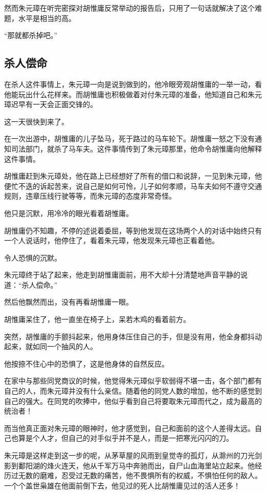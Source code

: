\begin{multicols}{\theparacolNo}
		然而朱元璋在听完密探对胡惟庸反常举动的报告后，只用了一句话就解决了这个难题，水平是相当的高。

		“那就都杀掉吧。”

		\subsection{杀人偿命}
		在杀人这件事情上，朱元璋一向是说到做到的，他冷眼旁观胡惟庸的一举一动，看他能玩出什么花样来。而胡惟庸也积极做着对付朱元璋的准备，他知道自己和朱元璋迟早有一天会正面交锋的。

		这一天很快到来了。

		在一次出游中，胡惟庸的儿子坠马，死于路过的马车轮下。胡惟庸一怒之下没有通知司法部门，就杀了马车夫。这件事情传到了朱元璋那里，他命令胡惟庸向他解释这件事情。

		胡惟庸赶到朱元璋处，他在路上已经想好了所有的借口和说辞，一见到朱元璋，他便忙不迭的诉起苦来，说自己是如何可怜，儿子如何孝顺，马车夫如何不遵守交通规则，违章压线行驶等等，而朱元璋的态度非常奇怪。

		他只是沉默，用冷冷的眼光看着胡惟庸。

		胡惟庸仍不知趣，不停的述说着委屈，等到他发现在这场两个人的对话中始终只有一个人说话时，他停住了，看着朱元璋，他发现朱元璋也正看着他。

		令人恐惧的沉默。

		朱元璋终于站了起来，他走到胡惟庸面前，用不大却十分清楚地声音平静的说道：“杀人偿命。”

		然后他飘然而出，没有再看胡惟庸一眼。

		胡惟庸呆住了，他一直坐在椅子上，呆若木鸡的看着前方。

		突然，胡惟庸的手颤抖起来，他用身体压住自己的手，但是没有用，他全身都抖动起来，就如同一个抽风的人。

		他按捺不住心中的恐惧了，这是他身体的自然反应。

		在家中与那些同党商议的时候，他觉得朱元璋似乎软弱得不堪一击，各个部门都有自己的人，而朱元璋并没有什么亲信。随着他的同党人数的增加，他不断的感觉到自己的强大。在同党的吹捧中，他似乎看到自己将要取朱元璋而代之，成为最高的统治者！

		而当他真正面对朱元璋的眼神时，他才感觉到，自己和面前的这个人差得太远。自己也算是个人才，但自己的对手似乎并不是人，而是一把寒光闪闪的刀。

		朱元璋是这样走到这一步的呢，从茅草屋的风雨到皇觉寺的孤灯，从滁州的刀光剑影到鄱阳湖的烽火连天，他从千军万马中奔驰而出，自尸山血海里站立起来。他经历过无数的磨难，忍受过无数的痛苦，他不畏惧所有的权威，不惧怕任何的敌人。一个个盖世枭雄在他面前倒下去，他见过的死人比胡惟庸见过的活人还多！


\end{multicols}

